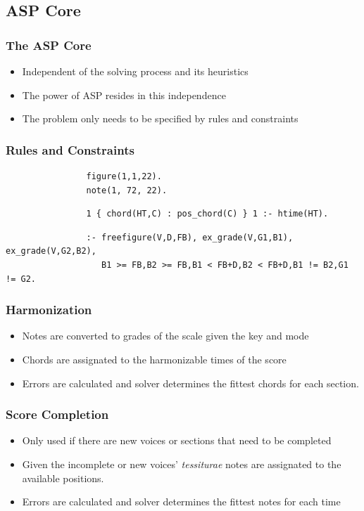 \documentclass[english]{beamer}
\begin{document}
\subsection{ASP Core}
	\begin{frame}
		\frametitle{The ASP Core}
		\begin{itemize}
			\item Independent of the solving process and its heuristics
			\item The power of ASP resides in this independence
			\item The problem only needs to be specified by rules and constraints
		\end{itemize}
	\end{frame}
	\begin{frame}[fragile]
		\frametitle{Rules and Constraints}
		\begin{example}
			\begin{verbatim}
				figure(1,1,22).
				note(1, 72, 22).
			\end{verbatim}
		\end{example}
		\begin{example}
			\begin{verbatim}
				1 { chord(HT,C) : pos_chord(C) } 1 :- htime(HT).
			\end{verbatim}
		\end{example}
		\begin{example}
			\begin{verbatim}
				:- freefigure(V,D,FB), ex_grade(V,G1,B1), ex_grade(V,G2,B2),
				   B1 >= FB,B2 >= FB,B1 < FB+D,B2 < FB+D,B1 != B2,G1 != G2.
			\end{verbatim}
		\end{example}
	\end{frame}
	\begin{frame}
	\frametitle{Harmonization}
	\begin{itemize}
		\item Notes are converted to grades of the scale given the key and mode
		\item Chords are assignated to the harmonizable times of the score
		\item Errors are calculated and solver determines the fittest chords for each section.
	\end{itemize}
	\end{frame}
	\begin{frame}
	\frametitle{Score Completion}
	\begin{itemize}
		\item Only used if there are new voices or sections that need to be completed
		\item Given the incomplete or new voices' \textit{tessiturae} notes are assignated to the available positions.
		\item Errors are calculated and solver determines the fittest notes for each time
	\end{itemize}
	\end{frame}
\end{document}
